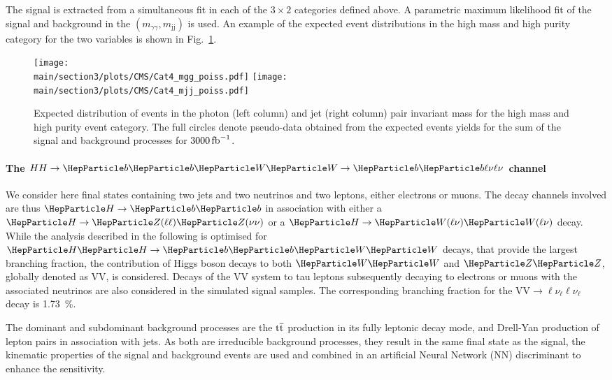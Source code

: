 The signal is extracted from a simultaneous fit in each of the $3 \times 2$ categories defined above.
A parametric maximum likelihood fit of the signal and background in the $(m_{\gamma\gamma}, m_\text{jj})$ is used.
An example of the expected event distributions in the high mass and high purity category for the two variables is shown in Fig.~\ref{sec3:CMSHH:fig:bbgg_events}.

\begin{figure}[!htb]
\centering 
    \texttt{[image: \\main/section3/plots/CMS/Cat4\_mgg\_poiss.pdf]}
    \texttt{[image: \\main/section3/plots/CMS/Cat4\_mjj\_poiss.pdf]}
\caption{Expected distribution of events in the photon (left column) and jet (right column) pair invariant mass for the high mass and high purity event category. The full circles denote pseudo-data obtained from the expected events yields for the sum of the signal and background processes for $3000\mbox{\ensuremath{\,\text{fb}^\text{$-$1}}}$.} 
\label{sec3:CMSHH:fig:bbgg_events} 
\end{figure}

\paragraph{The $HH \rightarrow \bbWW \to \PQb\PQb\ell\nu\ell\nu$ channel}

We consider here \HH final states containing two \PQb jets  and two neutrinos and two leptons, either electrons or muons.
The decay channels involved are thus $\PH\to\bb$ in association with either a $\PH\to\PZ(\ell\ell)\PZ(\nu\nu)$ or a $\PH \to \PW(\ell\nu)\PW(\ell\nu)$ decay.
While the analysis described in the following is optimised for $\HH\to\bbWW$ decays, that provide the largest branching fraction, the contribution of Higgs boson decays to both $\PW\PW$ and $\PZ\PZ$, globally denoted as $\text{VV}$, is considered.
Decays of the $\text{VV}$ system to tau leptons subsequently decaying to electrons or muons with the associated neutrinos are also considered in the simulated signal samples.
The corresponding branching fraction for the $\text{VV}\to\ell\nu_\ell\ell\nu_\ell$ decay is 1.73~\%.

The dominant and subdominant background processes are
the $\text{t}\overline{\text{t}}$ production in its fully leptonic decay mode, and
Drell-Yan production of lepton pairs in association with jets.
As both are irreducible background processes, \ie they result in the same final state as the signal, the kinematic properties of the signal and background events are used and combined in an artificial Neural Network (NN) discriminant to enhance the sensitivity.

